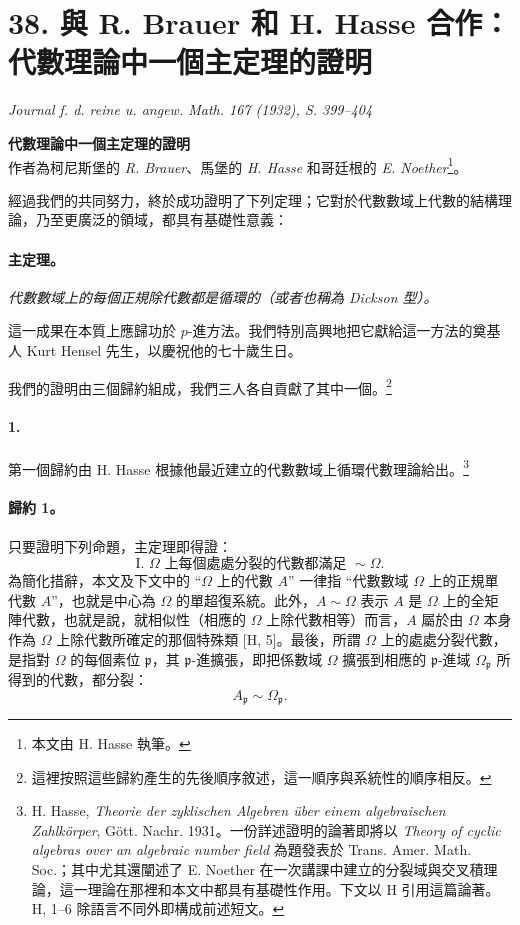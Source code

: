 \documentclass[11pt]{article}
\providecommand{\glqq}{“}
\providecommand{\grqq}{”}
\begin{document}
\setcounter{footnote}{0}

\section*{38. 與 R. Brauer 和 H. Hasse 合作：代數理論中一個主定理的證明}

\begin{center}
\emph{Journal f. d. reine u. angew. Math. 167 (1932), S. 399--404}
\end{center}

\begin{center}
\textbf{代數理論中一個主定理的證明}\\[0.5em]
作者為柯尼斯堡的 \emph{R. Brauer}、馬堡的 \emph{H. Hasse} 和哥廷根的 \emph{E. Noether}\footnote{本文由 H. Hasse 執筆。}。
\end{center}

經過我們的共同努力，終於成功證明了下列定理；它對於代數數域上代數的結構理論，乃至更廣泛的領域，都具有基礎性意義：

\paragraph{主定理。}
\emph{代數數域上的每個正規除代數都是循環的（或者也稱為 Dickson 型）。}

這一成果在本質上應歸功於 \(p\)-進方法。我們特別高興地把它獻給這一方法的奠基人 Kurt Hensel 先生，以慶祝他的七十歲生日。

我們的證明由三個歸約組成，我們三人各自貢獻了其中一個。\footnote{這裡按照這些歸約產生的先後順序敘述，這一順序與系統性的順序相反。}

\paragraph{1.}
第一個歸約由 H. Hasse 根據他最近建立的代數數域上循環代數理論給出。\footnote{H. Hasse, \emph{Theorie der zyklischen Algebren über einem algebraischen Zahlkörper}, Gött. Nachr. 1931。一份詳述證明的論著即將以 \emph{Theory of cyclic algebras over an algebraic number field} 為題發表於 Trans. Amer. Math. Soc.；其中尤其還闡述了 E. Noether 在一次講課中建立的分裂域與交叉積理論，這一理論在那裡和本文中都具有基礎性作用。下文以 H 引用這篇論著。H, 1--6 除語言不同外即構成前述短文。}

\paragraph{歸約 1。}
只要證明下列命題，主定理即得證：
\[
\text{I. }\Omega\text{ 上每個處處分裂的代數都滿足 } \sim \Omega .
\]
為簡化措辭，本文及下文中的 \glqq{}\(\Omega\) 上的代數 \(A\)\grqq{} 一律指 \glqq{}代數數域 \(\Omega\) 上的正規單代數 \(A\)\grqq{}，也就是中心為 \(\Omega\) 的單超復系統。此外，\(A\sim\Omega\) 表示 \(A\) 是 \(\Omega\) 上的全矩陣代數，也就是說，就相似性（相應的 \(\Omega\) 上除代數相等）而言，\(A\) 屬於由 \(\Omega\) 本身作為 \(\Omega\) 上除代數所確定的那個特殊類 [H, 5]。最後，所謂 \(\Omega\) 上的處處分裂代數，是指對 \(\Omega\) 的每個素位 \(\mathfrak p\)，其 \(\mathfrak p\)-進擴張，即把係數域 \(\Omega\) 擴張到相應的 \(\mathfrak p\)-進域 \(\Omega_{\mathfrak p}\) 所得到的代數，都分裂：
\[
A_{\mathfrak p}\sim \Omega_{\mathfrak p}.
\]
\end{document}
